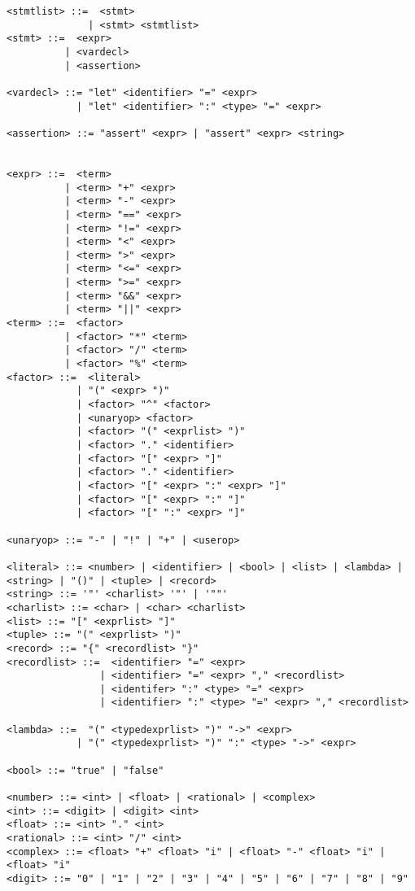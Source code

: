 \begin{verbatim}
<stmtlist> ::=  <stmt> 
              | <stmt> <stmtlist>
<stmt> ::=  <expr> 
          | <vardecl>
          | <assertion>
          
<vardecl> ::= "let" <identifier> "=" <expr>
            | "let" <identifier> ":" <type> "=" <expr>
            
<assertion> ::= "assert" <expr> | "assert" <expr> <string>
                

<expr> ::=  <term> 
          | <term> "+" <expr> 
          | <term> "-" <expr>
          | <term> "==" <expr>
          | <term> "!=" <expr>
          | <term> "<" <expr>
          | <term> ">" <expr>
          | <term> "<=" <expr>
          | <term> ">=" <expr>
          | <term> "&&" <expr>
          | <term> "||" <expr>
<term> ::=  <factor> 
          | <factor> "*" <term> 
          | <factor> "/" <term> 
          | <factor> "%" <term> 
<factor> ::=  <literal> 
            | "(" <expr> ")" 
            | <factor> "^" <factor>
            | <unaryop> <factor>
            | <factor> "(" <exprlist> ")"
            | <factor> "." <identifier>
            | <factor> "[" <expr> "]"
            | <factor> "." <identifier>
            | <factor> "[" <expr> ":" <expr> "]"
            | <factor> "[" <expr> ":" "]"
            | <factor> "[" ":" <expr> "]"

<unaryop> ::= "-" | "!" | "+" | <userop>

<literal> ::= <number> | <identifier> | <bool> | <list> | <lambda> | <string> | "()" | <tuple> | <record>
<string> ::= '"' <charlist> '"' | '""'
<charlist> ::= <char> | <char> <charlist>
<list> ::= "[" <exprlist> "]"
<tuple> ::= "(" <exprlist> ")"
<record> ::= "{" <recordlist> "}"
<recordlist> ::=  <identifier> "=" <expr> 
                | <identifier> "=" <expr> "," <recordlist>
                | <identifer> ":" <type> "=" <expr> 
                | <identifier> ":" <type> "=" <expr> "," <recordlist>
            
<lambda> ::=  "(" <typedexprlist> ")" "->" <expr>
            | "(" <typedexprlist> ")" ":" <type> "->" <expr>

<bool> ::= "true" | "false"
            
<number> ::= <int> | <float> | <rational> | <complex>
<int> ::= <digit> | <digit> <int>
<float> ::= <int> "." <int>
<rational> ::= <int> "/" <int>
<complex> ::= <float> "+" <float> "i" | <float> "-" <float> "i" | <float> "i"
<digit> ::= "0" | "1" | "2" | "3" | "4" | "5" | "6" | "7" | "8" | "9"


\end{verbatim}
